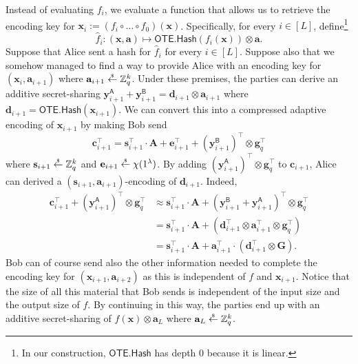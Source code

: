 \documentclass{theoretics}
\newcommand{\getsr}{\overset{\raisebox{-1pt}{$\scriptscriptstyle \$$}}{\gets}}
\newcommand{\sample}{\getsr}
\newcommand{\OTE}{\mathsf{OTE}}
\newcommand{\Z}{\mathbb{Z}}
\renewcommand{\sec}{\ensuremath{\lambda}}
\newcommand{\algofont}[1]{\ensuremath{\mathsf{#1}}}
\newcommand{\Hash}{{\algofont{Hash}}}
\newcommand\bbbone{1}
\begin{document}
Instead of evaluating $f_i$, we evaluate a function that allows us to retrieve the encoding key for $\mathbf{x}_i:=(f_i\circ \dots\circ f_0)(\mathbf{x})$. Specifically, for every $i\in[L]$, define\footnote{In our construction, $\OTE.\Hash$ has depth 0 because it is linear.}
\[\hat{f}_i:(\mathbf{x}, \mathbf{a})\longmapsto \OTE.\Hash(f_i(\mathbf{x}))\otimes \mathbf{a}.\] Suppose that Alice sent a hash for $\hat{f}_{i}$ for every $i\in[L]$. Suppose also that we somehow managed to find a way to provide Alice with an encoding key for $(\mathbf{x}_i, \mathbf{a}_{i+1})$ where $\mathbf{a}_{i+1}\sample\Z_q^k$. Under these premises, the parties can derive an additive secret-sharing $\mathbf{y}^{\mathsf{A}}_{i+1}+\mathbf{y}^{\mathsf{B}}_{i+1}=\mathbf{d}_{i+1}\otimes \mathbf{a}_{i+1}$ where $\mathbf{d}_{i+1}=\OTE.\Hash(\mathbf{x}_{i+1})$. We can convert this into a compressed adaptive encoding of $\mathbf{x}_{i+1}$ by making Bob send \[\mathbf{c}_{i+1}^\intercal=\mathbf{s}_{i+1}^\intercal\cdot \mathbf{A}+\mathbf{e}_{i+1}^\intercal+(\mathbf{y}^{\mathsf{B}}_{i+1})^\intercal\otimes \mathbf{g}_q^\intercal\] where $\mathbf{s}_{i+1}\sample\Z_q^k$ and $\mathbf{e}_{i+1}\sample\chi(\bbbone^\sec)$. By adding $(\mathbf{y}^{\mathsf{A}}_{i+1})^\intercal\otimes\mathbf{g}_q^\intercal$ to $\mathbf{c}_{i+1}$, Alice can derived a $(\mathbf{s}_{i+1}, \mathbf{a}_{i+1})$-encoding of $\mathbf{d}_{i+1}$. Indeed,
\begin{align*}
    \mathbf{c}_{i+1}^\intercal+(\mathbf{y}^{\mathsf{A}}_{i+1})^\intercal\otimes\mathbf{g}_q^\intercal&\approx \mathbf{s}_{i+1}^\intercal\cdot \mathbf{A}+(\mathbf{y}^{\mathsf{B}}_{i+1}+\mathbf{y}^{\mathsf{A}}_{i+1})^\intercal\otimes \mathbf{g}_q^\intercal\\
    &=\mathbf{s}_{i+1}^\intercal\cdot \mathbf{A}+(\mathbf{d}_{i+1}^\intercal\otimes \mathbf{a}_{i+1}^\intercal\otimes \mathbf{g}_q^\intercal)\\
    &=\mathbf{s}_{i+1}^\intercal\cdot \mathbf{A}+\mathbf{a}_{i+1}^\intercal\cdot (\mathbf{d}_{i+1}^\intercal\otimes \mathbf{G}).
\end{align*}Bob can of course send also the other information needed to complete the encoding key for $(\mathbf{x}_{i+1}, \mathbf{a}_{i+2})$ as this is independent of $f$ and $\mathbf{x}_{i+1}$. Notice that the size of all this material that Bob sends is independent of the input size and the output size of $f$. By continuing in this way, the parties end up with an additive secret-sharing of $f(\mathbf{x})\otimes \mathbf{a}_L$ where $\mathbf{a}_L\sample\Z_q^k$.
\end{document}
